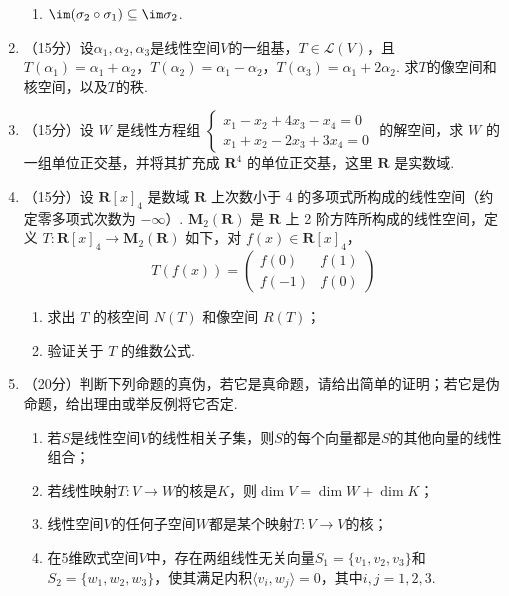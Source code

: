 \begin{enumerate}
\begin{enumerate}
        \item $\im(\sigma_2\circ\sigma_1)\subseteq\im\sigma_2$.
    \end{enumerate}
	\item （15分）设$\alpha_1,\alpha_2,\alpha_3$是线性空间$V$的一组基，$T\in\mathcal{L}(V)$，且$T(\alpha_1)=\alpha_1+\alpha_2$，$T(\alpha_2)=\alpha_1-\alpha_2$，$T(\alpha_3)=\alpha_1+2\alpha_2$. 求$T$的像空间和核空间，以及$T$的秩.
	\item （15分）设 $W$ 是线性方程组 $\begin{cases}
        x_1-x_2+4x_3-x_4=0 \\ x_1+x_2-2x_3+3x_4=0
    \end{cases}$ 的解空间，求 $W$ 的一组单位正交基，并将其扩充成 $\mathbf{R}^4$ 的单位正交基，这里 $\mathbf{R}$ 是实数域.
	\item （15分）设 $\mathbf{R}[x]_4$ 是数域 $\mathbf{R}$ 上次数小于 4 的多项式所构成的线性空间（约定零多项式次数为 $-\infty$）. $\mathbf{M}_2(\mathbf{R})$ 是 $\mathbf{R}$ 上 2 阶方阵所构成的线性空间，定义 $T\colon \mathbf{R}[x]_4 \to \mathbf{M}_2(\mathbf{R})$ 如下，对 $f(x) \in \mathbf{R}[x]_4$，
    \[T(f(x))=\begin{pmatrix}f(0) & f(1) \\ f(-1) & f(0)\end{pmatrix}\]
    \begin{enumerate}
        \item 求出 $T$ 的核空间 $N(T)$ 和像空间 $R(T)$；

        \item 验证关于 $T$ 的维数公式.
    \end{enumerate}
	\item （20分）判断下列命题的真伪，若它是真命题，请给出简单的证明；若它是伪命题，给出理由或举反例将它否定.
	\begin{enumerate}
        \item 若$S$是线性空间$V$的线性相关子集，则$S$的每个向量都是$S$的其他向量的线性组合；

        \item 若线性映射$T\colon V\to W$的核是$K$，则$\dim V=\dim W+\dim K$；

        \item 线性空间$V$的任何子空间$W$都是某个映射$T\colon V\to V$的核；

        \item 在5维欧式空间$V$中，存在两组线性无关向量$S_1=\{v_1,v_2,v_3\}$和$S_2=\{w_1,w_2,w_3\}$，使其满足内积$\langle v_i,w_j\rangle=0$，其中$i,j=1,2,3$.
    \end{enumerate}
\end{enumerate}

\clearpage
